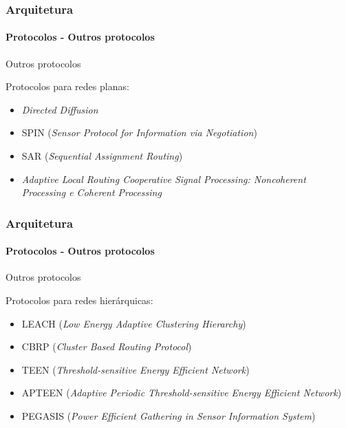 \documentclass[notes]{beamer}
\begin{document}
\begin{frame}
\label{slide_50}
\frametitle{Arquitetura}
\framesubtitle{Protocolos - Outros protocolos}

\begin{block}{Outros protocolos}

Protocolos para redes planas: \pause

\begin{itemize}

\item \textit{Directed Diffusion} \pause
\item SPIN (\textit{Sensor Protocol for Information via Negotiation}) \pause
\item SAR (\textit{Sequential Assignment Routing}) \pause
\item \textit{Adaptive Local Routing Cooperative Signal Processing: Noncoherent Processing e Coherent Processing}

\end{itemize}

\end{block}

\end{frame}

\begin{frame}
\label{slide_51}
\frametitle{Arquitetura}
\framesubtitle{Protocolos - Outros protocolos}

\begin{block}{Outros protocolos}

Protocolos para redes hierárquicas: \pause

\begin{itemize}

\item LEACH (\textit{Low Energy Adaptive Clustering Hierarchy}) \pause
\item CBRP (\textit{Cluster Based Routing Protocol}) \pause
\item TEEN (\textit{Threshold-sensitive Energy Efficient Network}) \pause
\item APTEEN (\textit{Adaptive Periodic Threshold-sensitive Energy Efficient Network}) \pause
\item PEGASIS (\textit{Power Efficient Gathering in Sensor Information System})

\end{itemize}

\end{block}

\end{frame}
\end{document}
